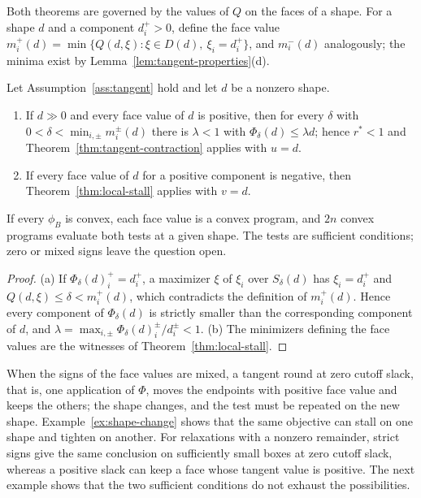 Both theorems are governed by the values of $Q$ on the faces of a shape.
For a shape $d$ and a component $d_i^+>0$, define the face value
$m_i^+(d)=\min\{Q(d,\xi):\xi\in D(d),\ \xi_i=d_i^+\}$, and $m_i^-(d)$
analogously; the minima exist by Lemma~\ref{lem:tangent-properties}(d).

\begin{corollary}\label{cor:face-test}
Let Assumption~\ref{ass:tangent} hold and let $d$ be a nonzero shape.
\begin{enumerate}[label=(\alph*)]
\item If $d\gg0$ and every face value of $d$ is positive, then for every
  $\delta$ with $0<\delta<\min_{i,\pm}m_i^\pm(d)$ there is $\lambda<1$ with
  $\Phi_\delta(d)\le\lambda d$; hence $r^*<1$ and
  Theorem~\ref{thm:tangent-contraction} applies with $u=d$.
\item If every face value of $d$ for a positive component is negative, then
  Theorem~\ref{thm:local-stall} applies with $v=d$.
\end{enumerate}
If every $\phi_B$ is convex, each face value is a convex program, and $2n$
convex programs evaluate both tests at a given shape. The tests are
sufficient conditions; zero or mixed signs leave the question open.
\end{corollary}

\begin{proof}
(a) If $\Phi_\delta(d)_i^+=d_i^+$, a maximizer $\xi$ of $\xi_i$ over $S_\delta(d)$
has $\xi_i=d_i^+$ and $Q(d,\xi)\le\delta<m_i^+(d)$, which contradicts the
definition of $m_i^+(d)$. Hence every component of $\Phi_\delta(d)$ is
strictly smaller than the corresponding component of $d$, and
$\lambda=\max_{i,\pm}\Phi_\delta(d)_i^\pm/d_i^\pm<1$. (b) The minimizers
defining the face values are the witnesses of Theorem~\ref{thm:local-stall}.
\end{proof}

When the signs of the face values are mixed, a tangent round at zero cutoff
slack, that is, one application of $\Phi$, moves the endpoints with positive
face value and keeps the others; the shape changes, and the test must be
repeated on the new shape. Example~\ref{ex:shape-change} shows that the same
objective can stall on one shape and tighten on another. For relaxations
with a nonzero remainder, strict signs give the same conclusion on
sufficiently small boxes at zero cutoff slack, whereas a positive slack can
keep a face whose tangent value is positive. The next example shows that
the two sufficient conditions do not exhaust the possibilities.

